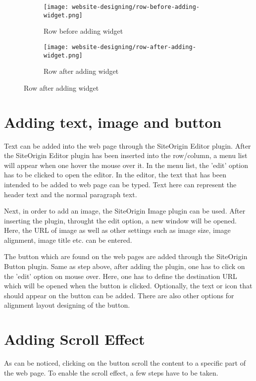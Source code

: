 \begin{figure}[ht]
\centering
	\begin{subfigure}{.49\linewidth}
	\centering
	\caption{Row before adding widget}
	\label{row-before-adding-widget}
	\texttt{[image: website-designing/row-before-adding-widget.png]}
	\end{subfigure}
	\begin{subfigure}{0.49\linewidth}
	\centering
	\caption{Row after adding widget}
	\label{Row after adding widget}
	\texttt{[image: website-designing/row-after-adding-widget.png]}
	\end{subfigure}
\end{figure}

\section{Adding text, image and button}
Text can be added into the web page through the SiteOrigin Editor plugin. After the SiteOrigin Editor plugin has been inserted into the row/column, a menu list will appear when one hover the mouse over it. In the menu list, the 'edit' option has to be clicked to open the editor. In the editor, the text that has been intended to be added to web page can be typed. Text here can represent the header text and the normal paragraph text.

Next, in order to add an image, the SiteOrigin Image plugin can be used. After inserting the plugin, throught the edit option, a new window will be opened. Here, the URL of image as well as other settings such as image size, image alignment, image title etc. can be entered.

The button which are found on the web pages are added through the SiteOrigin Button plugin. Same as step above, after adding the plugin, one has to click on the 'edit' option on mouse over. Here, one has to define the destination URL which will be opened when the button is clicked. Optionally, the text or icon that should appear on the button can be added. There are also other options for alignment layout designing of the button.

\section{Adding Scroll Effect}
As can be noticed, clicking on the button scroll the content to a specific part of the web page. To enable the scroll effect, a few steps have to be taken.

